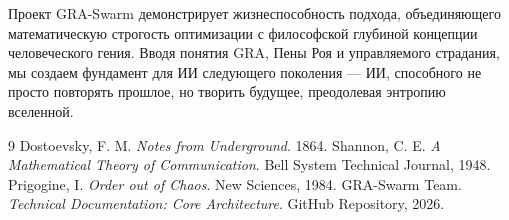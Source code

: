 \documentclass[12pt, a4paper]{article}
\begin{document}
Проект GRA-Swarm демонстрирует жизнеспособность подхода, объединяющего математическую строгость оптимизации с философской глубиной концепции человеческого гения. Вводя понятия GRA, Пены Роя и управляемого страдания, мы создаем фундамент для ИИ следующего поколения — ИИ, способного не просто повторять прошлое, но творить будущее, преодолевая энтропию вселенной.

\begin{thebibliography}{9}
 Dostoevsky, F. M. \textit{Notes from Underground}. 1864.
 Shannon, C. E. \textit{A Mathematical Theory of Communication}. Bell System Technical Journal, 1948.
 Prigogine, I. \textit{Order out of Chaos}. New Sciences, 1984.
 GRA-Swarm Team. \textit{Technical Documentation: Core Architecture}. GitHub Repository, 2026.
\end{thebibliography}
\end{document}
